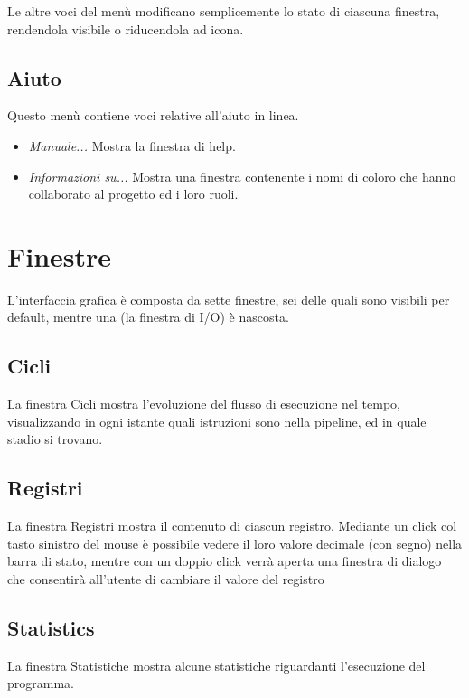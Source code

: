 \documentclass[letterpaper,10pt,italian]{sphinxmanual}
\begin{document}
Le altre voci del menù modificano semplicemente lo stato di ciascuna
finestra, rendendola visibile o riducendola ad icona.


\subsection{Aiuto}
\label{user-interface:aiuto}
Questo menù contiene voci relative all'aiuto in linea.
\begin{itemize}
\item {} 
\emph{Manuale...} Mostra la finestra di help.

\item {} 
\emph{Informazioni su...} Mostra una finestra contenente i nomi di coloro
che hanno collaborato al progetto ed i loro ruoli.

\end{itemize}


\section{Finestre}
\label{user-interface:finestre}
L'interfaccia grafica è composta da sette finestre, sei delle quali sono
visibili per default, mentre una (la finestra di I/O) è nascosta.


\subsection{Cicli}
\label{user-interface:cicli}
La finestra Cicli mostra l'evoluzione del flusso di esecuzione nel tempo,
visualizzando in ogni istante quali istruzioni sono nella pipeline, ed in
quale stadio si trovano.


\subsection{Registri}
\label{user-interface:registri}
La finestra Registri mostra il contenuto di ciascun registro. Mediante un
click col tasto sinistro del mouse è possibile vedere il loro valore
decimale (con segno) nella barra di stato, mentre con un doppio click
verrà aperta una finestra di dialogo che consentirà all'utente di
cambiare il valore del registro


\subsection{Statistics}
\label{user-interface:statistics}
La finestra Statistiche mostra alcune statistiche riguardanti l'esecuzione del
programma.
\end{document}
